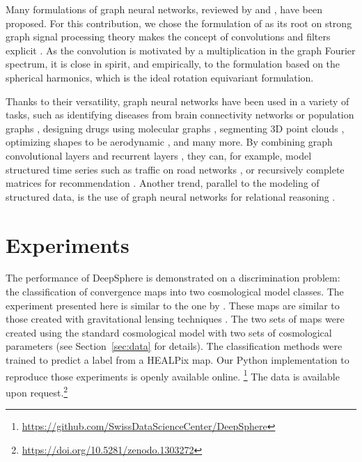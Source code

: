 \documentclass[final,twocolumn,3p,times,sort&compress]{elsarticle}
\newcommand{\secref}[1]{Section~\ref{sec:#1}}
\newcommand{\1}{\b{1}}              %
\newcommand{\0}{\b{0}}              %
\begin{document}
Many formulations of graph neural networks, reviewed by \citep{bronstein2017review} and \citep{hamilton2017review}, have been proposed.
For this contribution, we chose the formulation of \citep{defferrard2016convolutional} as its root on strong graph signal processing theory makes the concept of convolutions and filters explicit \citep{shuman2013emerging}.
As the convolution is motivated by a multiplication in the graph Fourier spectrum, it is close in spirit, and empirically, to the formulation based on the spherical harmonics, which is the ideal rotation equivariant formulation.

Thanks to their versatility, graph neural networks have been used in a variety of tasks, such as identifying diseases from brain connectivity networks \citep{ktena2018metriclearning} or population graphs \citep{parisot2017disease}, designing drugs using molecular graphs \citep{hop2018drugdesign}, segmenting 3D point clouds \citep{qi2017pointcloudsegmentation}, optimizing shapes to be aerodynamic \citep{baque2018shape}, and many more.
By combining graph convolutional layers and recurrent layers \citep{seo2016gcrn}, they can, for example, model structured time series such as traffic on road networks \citep{li2018traffic}, or recursively complete matrices for recommendation \citep{monti2017recommendation}.
Another trend, parallel to the modeling of structured data, is the use of graph neural networks for relational reasoning \citep{battaglia2018review}.

\section{Experiments}
\label{sec:experiments}

The performance of DeepSphere is demonstrated on a discrimination problem: the classification of convergence maps into two cosmological model classes.
The experiment presented here is similar to the one by \citep{schmelze2017cosmologicalmodel}.
These maps are similar to those created with gravitational lensing techniques \citep{chang2017curvedsky}.
The two sets of maps were created using the standard cosmological model with two sets of cosmological parameters (see \secref{data} for details).
The classification methods were trained to predict a label from a HEALPix map.
Our Python implementation to reproduce those experiments is openly available online.{ \footnote{\url{https://github.com/SwissDataScienceCenter/DeepSphere}}}
The data is available upon request.\footnote{\url{https://doi.org/10.5281/zenodo.1303272}}
\end{document}
